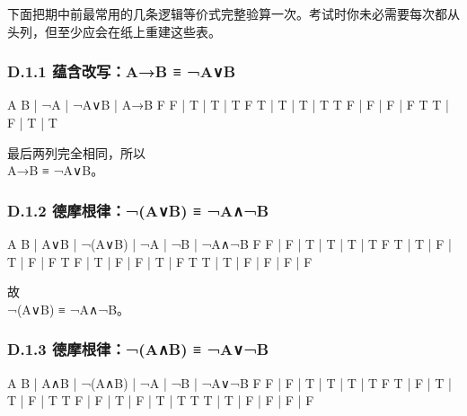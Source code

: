 \documentclass[
  11pt,
]{article}
\newenvironment{Shaded}{}{}
\newcommand{\NormalTok}[1]{#1}
\begin{document}
下面把期中前最常用的几条逻辑等价式完整验算一次。考试时你未必需要每次都从头列，但至少应会在纸上重建这些表。

\subsubsection{D.1.1 蕴含改写：A→B ≡
¬A∨B}\label{d.1.1-ux8574ux542bux6539ux5199ab-ab}

\begin{Shaded}
\begin{Highlighting}[]
\NormalTok{A  B | ¬A | ¬A∨B | A→B}
\NormalTok{F  F |  T |   T  |  T}
\NormalTok{F  T |  T |   T  |  T}
\NormalTok{T  F |  F |   F  |  F}
\NormalTok{T  T |  F |   T  |  T}
\end{Highlighting}
\end{Shaded}

最后两列完全相同，所以\\
A→B ≡ ¬A∨B。

\subsubsection{D.1.2 德摩根律：¬(A∨B) ≡
¬A∧¬B}\label{d.1.2-ux5fb7ux6469ux6839ux5f8bab-ab}

\begin{Shaded}
\begin{Highlighting}[]
\NormalTok{A  B | A∨B | ¬(A∨B) | ¬A | ¬B | ¬A∧¬B}
\NormalTok{F  F |  F  |    T   |  T |  T |   T}
\NormalTok{F  T |  T  |    F   |  T |  F |   F}
\NormalTok{T  F |  T  |    F   |  F |  T |   F}
\NormalTok{T  T |  T  |    F   |  F |  F |   F}
\end{Highlighting}
\end{Shaded}

故\\
¬(A∨B) ≡ ¬A∧¬B。

\subsubsection{D.1.3 德摩根律：¬(A∧B) ≡
¬A∨¬B}\label{d.1.3-ux5fb7ux6469ux6839ux5f8bab-ab}

\begin{Shaded}
\begin{Highlighting}[]
\NormalTok{A  B | A∧B | ¬(A∧B) | ¬A | ¬B | ¬A∨¬B}
\NormalTok{F  F |  F  |    T   |  T |  T |   T}
\NormalTok{F  T |  F  |    T   |  T |  F |   T}
\NormalTok{T  F |  F  |    T   |  F |  T |   T}
\NormalTok{T  T |  T  |    F   |  F |  F |   F}
\end{Highlighting}
\end{Shaded}
\end{document}
